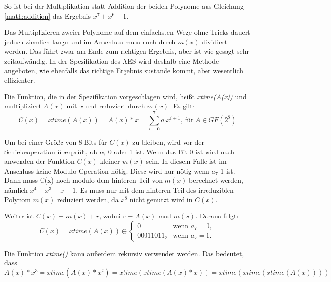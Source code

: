  So ist bei der Multiplikation statt Addition der beiden Polynome aus Gleichung \ref{math:addition} das
 Ergebnis $x^7 + x^6 +1$.
 
 Das Multiplizieren zweier Polynome auf dem einfachsten Wege ohne Tricks dauert jedoch ziemlich lange
 und im Anschluss muss noch durch $m(x)$ dividiert werden. Das führt zwar am Ende zum richtigen Ergebnis,
 aber ist wie gesagt sehr zeitaufwändig. In der Spezifikation des AES wird deshalb eine Methode angeboten,
 wie ebenfalls das richtige Ergebnis zustande kommt, aber wesentlich effizienter.
 
 Die Funktion, die in der Spezifikation vorgeschlagen wird, heißt \emph{xtime(A(x))} und multipliziert
 $A(x)$ mit $x$ und reduziert durch $m(x)$. Es gilt:
 \begin{equation*}
    C(x) = xtime(A(x)) = A(x) * x = \sum_{i=0}^7 a_ix^{i+1}, ~ \text{für}~ A \in GF(2^8)
 \end{equation*}
 
 Um bei einer Größe von 8 Bits für $C(x)$ zu bleiben, wird vor der Schiebeoperation überprüft, ob
 $a_7$ 0 oder 1 ist. Wenn das Bit 0 ist wird nach anwenden der Funktion $C(x)$ kleiner $m(x)$ sein. In
 diesem Falle ist im Anschluss keine Modulo-Operation nötig. Diese wird nur nötig wenn $a_7$ 1 ist. Dann
 muss C(x) noch modulo dem hinteren Teil von $m(x)$ berechnet werden, nämlich $x^4 + x^3 + x +1$. Es
 muss nur mit dem hinteren Teil des irreduziblen Polynom $m(x)$ reduziert werden, da $x^8$ nicht genutzt
 wird in $C(x)$. \cite{AES-FIPS}
 
 Weiter ist $C(x) = m(x) + r$, wobei $r = A(x)$ mod $m(x)$. Daraus folgt:
 \begin{equation*}
    C(x) = xtime(A(x)) \oplus \begin{cases}
      0	 		& \text{wenn $a_7 = 0$},\\
      00011011_2 	& \text{wenn $a_7 = 1$}.
     \end{cases}
 \end{equation*}
 
 Die Funktion \emph{xtime()} kann außerdem rekursiv verwendet werden. Das bedeutet, dass
 \begin{equation*}
    A(x) * x^3 = xtime(A(x) * x^2) = xtime(xtime(A(x) * x)) = xtime(xtime(xtime(A(x))))
 \end{equation*}
 

